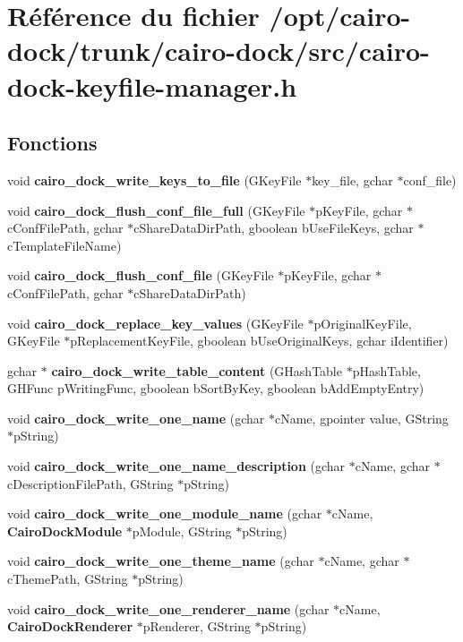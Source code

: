 \section{Référence du fichier /opt/cairo-dock/trunk/cairo-dock/src/cairo-dock-keyfile-manager.h}
\label{cairo-dock-keyfile-manager_8h}
\subsection*{Fonctions}
\begin{CompactItemize}
\item 
void {\bf cairo\_\-dock\_\-write\_\-keys\_\-to\_\-file} (GKeyFile $\ast$key\_\-file, gchar $\ast$conf\_\-file)
\item 
void {\bf cairo\_\-dock\_\-flush\_\-conf\_\-file\_\-full} (GKeyFile $\ast$pKeyFile, gchar $\ast$cConfFilePath, gchar $\ast$cShareDataDirPath, gboolean bUseFileKeys, gchar $\ast$cTemplateFileName)
\item 
void {\bf cairo\_\-dock\_\-flush\_\-conf\_\-file} (GKeyFile $\ast$pKeyFile, gchar $\ast$cConfFilePath, gchar $\ast$cShareDataDirPath)
\item 
void {\bf cairo\_\-dock\_\-replace\_\-key\_\-values} (GKeyFile $\ast$pOriginalKeyFile, GKeyFile $\ast$pReplacementKeyFile, gboolean bUseOriginalKeys, gchar iIdentifier)
\item 
gchar $\ast$ {\bf cairo\_\-dock\_\-write\_\-table\_\-content} (GHashTable $\ast$pHashTable, GHFunc pWritingFunc, gboolean bSortByKey, gboolean bAddEmptyEntry)
\item 
void {\bf cairo\_\-dock\_\-write\_\-one\_\-name} (gchar $\ast$cName, gpointer value, GString $\ast$pString)
\item 
void {\bf cairo\_\-dock\_\-write\_\-one\_\-name\_\-description} (gchar $\ast$cName, gchar $\ast$cDescriptionFilePath, GString $\ast$pString)
\item 
void {\bf cairo\_\-dock\_\-write\_\-one\_\-module\_\-name} (gchar $\ast$cName, {\bf CairoDockModule} $\ast$pModule, GString $\ast$pString)
\item 
void {\bf cairo\_\-dock\_\-write\_\-one\_\-theme\_\-name} (gchar $\ast$cName, gchar $\ast$cThemePath, GString $\ast$pString)
\item 
void {\bf cairo\_\-dock\_\-write\_\-one\_\-renderer\_\-name} (gchar $\ast$cName, {\bf CairoDockRenderer} $\ast$pRenderer, GString $\ast$pString)
\item 

\end{CompactItemize}
